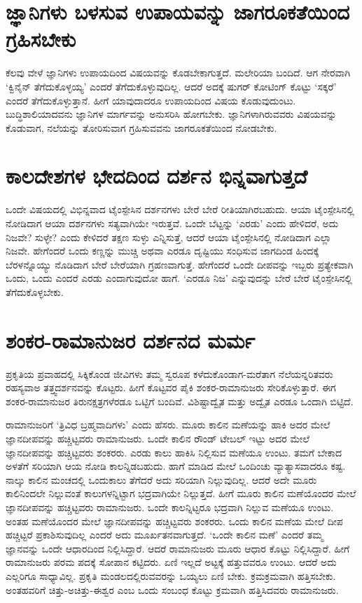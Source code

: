 \section*{ಜ್ಞಾನಿಗಳು ಬಳಸುವ ಉಪಾಯವನ್ನು ಜಾಗರೂಕತೆಯಿಂದ ಗ್ರಹಿಸಬೇಕು}

ಕೆಲವು ವೇಳೆ ಜ್ಞಾನಿಗಳು ಉಪಾಯದಿಂದ ವಿಷಯವನ್ನು ಕೊಡಬೇಕಾಗುತ್ತದೆ. ಮಲೇರಿಯಾ ಬಂದಿದೆ. ಆಗ ನೇರವಾಗಿ `ಕ್ವಿನೈನ್ ತೆಗೆದುಕೊಳ್ಳಯ್ಯ' ಎಂದರೆ ತೆಗೆದುಕೊಳ್ಳುವುದಿಲ್ಲ. ಆದರೆ ಅದಕ್ಕೆ ಷುಗರ್ ಕೋಟಿಂಗ್ ಕೊಟ್ಟು `ಸಕ್ಕರೆ' ಎಂದರೆ ತೆಗೆದುಕೊಳ್ಳುತ್ತಾನೆ. ಹೀಗೆ ಯಾವುದಾದರೂ ಉಪಾಯದಿಂದ ವಿಷಯ ಕೊಡುವುದುಂಟು. ಬುದ್ಧಿಶಾಲಿಯಾದವನು ಜ್ಞಾನಿಗಳ ಮಾರ್ಗವನ್ನು ಅನುಸರಿಸಿ ಹೋಗಬೇಕು. ಜ್ಞಾನಿಗಳಾಗಿರುವವರು ವಿಷಯವನ್ನು ಕೊಡುವಾಗ, ನಲೆಯನ್ನು ತೋರಿಸುವಾಗ ಗ್ರಹಿಸುವವನು ಜಾಗರೂಕತೆಯಿಂದ ನೋಡಬೇಕು.

\section*{ಕಾಲದೇಶಗಳ ಭೇದದಿಂದ ದರ್ಶನ ಭಿನ್ನವಾಗುತ್ತದೆ}

ಒಂದೇ ವಿಷಯದಲ್ಲಿ ವಿಭಿನ್ನವಾದ ಟೈಂಸ್ಪೇಸಿನ ದರ್ಶನಗಳು ಬೇರೆ ಬೇರೆ  ರೀತಿಯಾಗಿರಬಹುದು. ಆಯಾ ಟೈಂಸ್ಪೇಸಿನಲ್ಲಿ ನೋಡಿದಾಗ ಆಯಾ ದರ್ಶನಗಳು ಸತ್ಯವಾಗಿಯೇ ಇರುತ್ತವೆ. ಒಂದೇ ಬೆಟ್ಟನ್ನು `ಎರಡು' ಎಂದು ಹೇಳಿದರೆ, ಅದು ನಿಜವೇ? ಸುಳ್ಳೇ? ಎಂದು ಕೇಳಿದರೆ ತಕ್ಷಣ ಸುಳ್ಳು ಎನ್ನಿಸುತ್ತೆ, ಆದರೆ ಆಯಾ ಟೈಂಸ್ಪೇಸಿನಲ್ಲಿ ನೋಡಿದಾಗ ಎಲ್ಲಾ ನಿಜವೇ. ಹೇಗೆಂದರೆ ಒಂದು ಕಣ್ಣನ್ನು ಮುಚ್ಚಿ ಅಥವಾ ಎರಡೂ ದೃಷ್ಟಿಯು ಸಂಧಿಸುವ ಜಾಗದಿಂಡ ಹಿಂದಕ್ಕೆ ಬೆರಳನ್ನೊಯ್ಯು ನೊಡಿದಾಗ ಬೇರೆ ಬೇರೆಯಾಗಿ ಗ್ರಹಣವಾಗುತ್ತೆ. ಹೇಗೆಂದರೆ  ಒಂದೇ ದೀಪವನ್ನು ಇಬ್ಬರು ಪ್ರತ್ಯೇಕವಾಗಿ ಒಂದು, ಒಂದು ಎಂದರೆ ಎರಡು ಎಂದಾಗುವುದೋ ಹಾಗೆ. `ಎರಡೂ ನಿಜ' ಎನ್ನುವುದನ್ನು ಬೇರೆ ಬೇರೆ ಟೈಂಸ್ಪೇಸಿನಲ್ಲಿ ತೆಗೆದುಕೊಳ್ಳಬೇಕು.

\section*{ಶಂಕರ-ರಾಮಾನುಜರ ದರ್ಶನದ ಮರ್ಮ}

ಪ್ರಕೃತಿಯ ಪ್ರವಾಹದಲ್ಲಿ ಸಿಕ್ಕಿಕೊಂಡ ಜೀವಿಗಳು ತಮ್ಮ ಸ್ವರೂಪ ಕಳೆದುಕೊಂಡಾಗ-ಮರೆತಾಗ ನೆಲೆಯನ್ನರಿತವರು ರಹಸ್ಯವಾಅ ತತ್ತ್ವದರ್ಶನವನ್ನು ಕೊಟ್ಟರು. ಹೀಗೆ ಕೊಟ್ಟವರ ಪೈಕಿ ಶಂಕರ-ರಾಮಾನುಜರು ಸೇರಿಕೊಳ್ಳುತ್ತಾರೆ. ಈಗ ಶಂಕರ-ರಾಮಾನುಜರ ತಿರುನಕ್ಷತ್ರಗಳೆರಡೂ ಒಟ್ಟಿಗೆ ಬಂದಿವೆ. ವಿಶಿಷ್ಟಾದ್ವೈತ ಮತ್ತು ಅದ್ವೈತ ಎರಡೂ ಒಂದಾಗಿ ಬಿಟ್ಟಿದೆ.

ರಾಮಾನುಜರಿಗೆ `ತ್ರಿವಿಧ ಬ್ರಹ್ಮವಾದಿಗಳು' ಎಂದು ಹೆಸರು. ಮೂರು ಕಾಲಿನ ಮಣೆಯನ್ನು ಹಾಕಿ ಅದರ ಮೇಲೆ ಜ್ಞಾನದೀಪವನ್ನು ಹಚ್ಚಿಟ್ಟವರು ರಾಮಾನುಜರು. ಒಂದೇ ಕಾಲಿನ ರೌಂಡ್ ಟೇಬಲ್ ಇಟ್ಟು ಅದರ ಮೇಲೆ ಜ್ಞಾನದೀಪವನ್ನು ಹಚ್ಚಿಟ್ಟವರು ಶಂಕರರು. ಎರಡು ಕಾಲು ಹಾಕಿಸಿ ನಿಲ್ಲಿಸುವ ಮಣೆಯೂ ಉಂಟು. ತಮಗೆ ಬೇಕಾದ ಅಳತೆಗೆ ಸರಿಯಾಗಿ ಆಯ ನೋಡಿ ಕಾಲನ್ನಿಡಬಹುದು. ಹಾಗೆ ಮಾಡಿದ ಮೇಲೆ ಒಂದಿಂಚು ವ್ಯಾತ್ಯಾಸವಾದರೂ ಕಷ್ಟ. ನಾಲ್ಕು ಕಾಲಿನ ಮಂಚದಲ್ಲಿ ಒಂದುಕಾಲು ತೆಗೆದರೆ ಅದು ಸರಿಯಾಗಿ ನಿಲ್ಲುವುದಿಲ್ಲ. ಆದರೆ ಅದೇ ಮೂರು ಕಾಲಿನಿಂದಲೇ ನಿಲ್ಲುವಂತೆ ಕಾಲುಗಳನ್ನಿಟ್ಟಾಗ ಭದ್ರವಾಗಿಯೇ ನಿಲ್ಲುತ್ತದೆ. ಹೀಗೆ ಮೂರು ಕಾಲಿನ ಮಣೆಯೊಂದರ ಮೇಲೆ ಜ್ಞಾನದೀಪವನ್ನು ಹಚ್ಚಿಟ್ಟವರು ರಾಮಾನುಜರು. ಒಂದೇ ಕಾಲನ್ನಿಟ್ಟರೂ ಭದ್ರವಾಗಿ ನಿಲ್ಲುವ ಮಣೆಯೂ ಉಂಟು. ಅಂತಹ ಮಣೆಯೊಂದರ ಮೇಲೆ ಜ್ಞಾನದೀಪವನ್ನು ಹಚ್ಚಿಟ್ಟವರು ಶಂಕರರು. ಒಂದು ಕಾಲಿನ ಮಣೆಯ ಮೇಲೆ ದೀಪ ಹಚ್ಚಿಟ್ಟರೆ ಪ್ರಕಾಶಿಸುವುದಿಲ್ಲ ಎಂದರೆ ಅದು ಮೂರ್ಖತನವಾಗುತ್ತದೆ. `ಒಂದೇ ಕಾಲಿನ ಮಣೆ' ಎಂದರೆ ತಮ್ಮ ಜ್ಞಾನವನ್ನು ಒಂದೇ ಆಧಾರದಿಂದ ನಿಲ್ಲಿಸಿದ್ದಾರೆ. ಆದರೆ ರಾಮಾನುಜರು ಮೂರು ಆಧಾರ ಕೊಟ್ಟು ನಿಲ್ಲಿಸಿದ್ದಾರೆ. ಹೀಗೆ ರಾಮಾನುಜರು ಪರಮ ಪದಕ್ಕೆ ಸೋಪಾನ ಕಟ್ಟಿದರು. ಏಣಿ ಇಲ್ಲದೆ ಅಟ್ಟಕ್ಕೆ ಹತ್ತುವವರೂ ಉಂಟು. ಆದರೆ ಅದು ಎಲ್ಲರಿಗೂ ಸಾಧ್ಯಾವಿಲ್ಲ. ಪ್ರಕೃತಿ ಮಂಡಲದಲ್ಲಿರುವವರನ್ನು ಒಯ್ಯಲು ಏಣಿ ಬೇಕು. ಕ್ರಮಕ್ರಮವಾಗಿ ಹತ್ತಿಸಬೇಕು. ಅಂತಹವರಿಗೆ ಚಿತ್ತು-ಅಚಿತ್ತು-ಈಶ್ವರ ಎಂಬ ಒಂದು ಸಂಬಂಧ ಕೊಟ್ಟು ಕ್ರಮವಾಗಿ ಹತ್ತಿಸಿದವರು ರಾಮಾನುಜರು.

